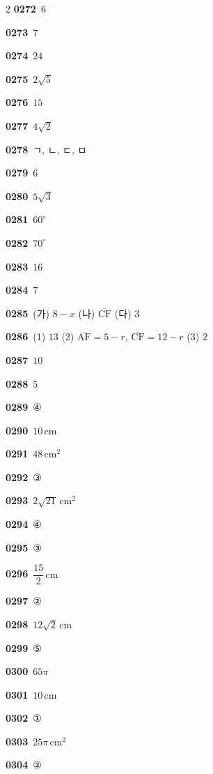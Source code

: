\documentclass[10pt,a4paper]{article}
\newcommand{\seg}[1]{\overline{\mathrm{#1}}}
\begin{document}
\begin{multicols}{2}
\noindent\textbf{0272}\ $6$\par
\noindent\textbf{0273}\ $7$\par
\noindent\textbf{0274}\ $24$\par
\noindent\textbf{0275}\ $2\sqrt{5}$\par
\noindent\textbf{0276}\ $15$\par
\noindent\textbf{0277}\ $4\sqrt{2}$\par
\noindent\textbf{0278}\ ㄱ, ㄴ, ㄷ, ㅁ\par
\noindent\textbf{0279}\ $6$\par
\noindent\textbf{0280}\ $5\sqrt{3}$\par
\noindent\textbf{0281}\ $60^\circ$\par
\noindent\textbf{0282}\ $70^\circ$\par
\noindent\textbf{0283}\ $16$\par
\noindent\textbf{0284}\ $7$\par
\noindent\textbf{0285}\ (가) $8-x$ (나) $\seg{CF}$ (다) $3$\par
\noindent\textbf{0286}\ (1) $13$ (2) $\seg{AF}=5-r$, $\seg{CF}=12-r$ (3) $2$\par
\noindent\textbf{0287}\ $10$\par
\noindent\textbf{0288}\ $5$\par
\noindent\textbf{0289}\ ④\par
\noindent\textbf{0290}\ $10\,\mathrm{cm}$\par
\noindent\textbf{0291}\ $48\,\mathrm{cm}^2$\par
\noindent\textbf{0292}\ ③\par
\noindent\textbf{0293}\ $2\sqrt{21}\,\mathrm{cm}^2$\par
\noindent\textbf{0294}\ ④\par
\noindent\textbf{0295}\ ③\par
\noindent\textbf{0296}\ $\dfrac{15}{2}\,\mathrm{cm}$\par
\noindent\textbf{0297}\ ②\par
\noindent\textbf{0298}\ $12\sqrt{2}\,\mathrm{cm}$\par
\noindent\textbf{0299}\ ⑤\par
\noindent\textbf{0300}\ $65\pi$\par
\noindent\textbf{0301}\ $10\,\mathrm{cm}$\par
\noindent\textbf{0302}\ ①\par
\noindent\textbf{0303}\ $25\pi\,\mathrm{cm}^2$\par
\noindent\textbf{0304}\ ②\par

\end{multicols}
\end{document}
